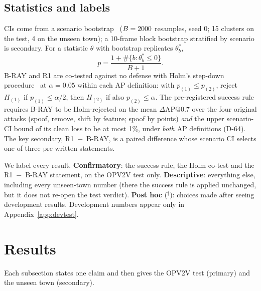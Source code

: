 \documentclass[conference]{IEEEtran}
\begin{document}
\subsection{Statistics and labels}
CIs come from a scenario bootstrap~\cite{efron1979bootstrap} ($B=2000$ resamples, seed 0; 15 clusters on the
test, 4 on the unseen town); a 10-frame block bootstrap stratified by scenario is secondary. For a statistic
$\theta$ with bootstrap replicates $\theta^*_b$,
\begin{equation}
p=\frac{1+\#\{b:\theta^*_b\le 0\}}{B+1}.
\label{eq:p}
\end{equation}
B-RAY and R1 are co-tested against no defense with Holm's step-down procedure~\cite{holm1979} at $\alpha=0.05$
within each AP definition: with $p_{(1)}\le p_{(2)}$, reject $H_{(1)}$ if $p_{(1)}\le\alpha/2$, then $H_{(2)}$ if
also $p_{(2)}\le\alpha$. The pre-registered success rule requires B-RAY to be Holm-rejected on the mean
$\Delta$AP@0.7 over the four original attacks (spoof, remove, shift by feature; spoof by points) \emph{and} the
upper scenario-CI bound of its clean loss to be at most 1\%, under \emph{both} AP definitions (D-64). The key
secondary, R1~$-$~B-RAY, is a paired difference whose scenario CI selects one of three pre-written statements.

We label every result. \textbf{Confirmatory}: the success rule, the Holm co-test and the R1~$-$~B-RAY statement,
on the OPV2V test only. \textbf{Descriptive}: everything else, including every unseen-town number (there the
success rule is applied unchanged, but it does not re-open the test verdict). \textbf{Post hoc} ($^\dagger$):
choices made after seeing development results. Development numbers appear only in Appendix~\ref{app:devtest}.

\section{Results}
\label{sec:results}
Each subsection states one claim and then gives the OPV2V test (primary) and the unseen town (secondary).
\end{document}
